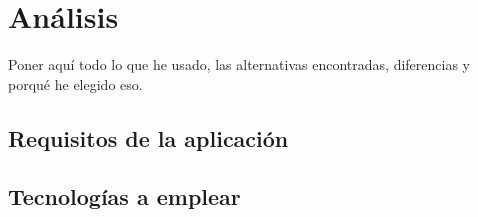 \chapter{Análisis}
Poner aquí todo lo que he usado, las alternativas encontradas, diferencias y porqué he elegido eso.
\section{Requisitos de la aplicación}
\section{Tecnologías a emplear}